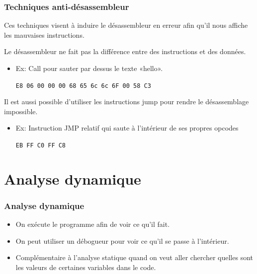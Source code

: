 \documentclass[10pt,xcolor={table,dvipsnames},t]{beamer}
\begin{document}
\begin{frame}
    \frametitle{Techniques anti-désassembleur}
    Ces techniques visent à induire le désassembleur en erreur afin qu'il nous affiche les mauvaises instructions.
    
    Le désassembleur ne fait pas la différence entre des instructions et des données.
    \begin{itemize}
        \item Ex: Call pour sauter par dessus le texte «hello». 
        
        \texttt{E8 06 00 00 00 68 65 6c 6c 6F 00 58 C3}
    \end{itemize}
    
    Il est aussi possible d'utiliser les instructions jump pour rendre le désassemblage impossible.
    \begin{itemize}
        \item Ex: Instruction JMP relatif qui saute à l'intérieur de ses propres opcodes
        
        \texttt{EB FF C0 FF C8}
    \end{itemize}
\end{frame}


\section{Analyse dynamique}

\begin{frame}
    \frametitle{Analyse dynamique}
    \begin{itemize}
        \item On exécute le programme afin de voir ce qu'il fait.
        \item On peut utiliser un débogueur pour voir ce qu'il se passe à l'intérieur.
        \item Complémentaire à l'analyse statique quand on veut aller chercher quelles sont les valeurs de certaines variables dans le code.
    \end{itemize}

\end{frame}
\end{document}
